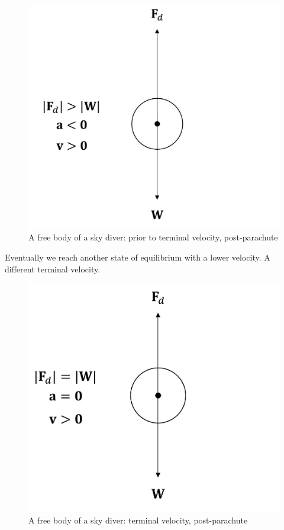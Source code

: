 \begin{figure}[h!]
    \centering
    \includegraphics[scale=0.3]{notes/images/Terminal-Velocity-5.JPG}
    \caption{A free body of a sky diver: prior to terminal velocity, post-parachute }
    \label{fig:terminal-velocity-5}
\end{figure}
\FloatBarrier
Eventually we reach another state of equilibrium with a lower velocity. A different terminal velocity.
\begin{figure}[h!]
    \centering
    \includegraphics[scale=0.3]{notes/images/Terminal-Velocity-6.JPG}
    \caption{A free body of a sky diver: terminal velocity, post-parachute }
    \label{fig:terminal-velocity-6}
\end{figure}
\FloatBarrier

